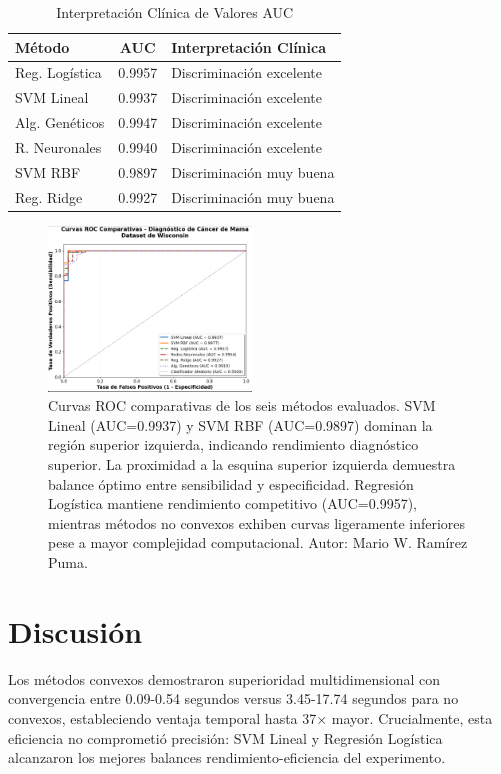 \documentclass[conference]{IEEEtran}
\begin{document}
\begin{table}[htbp]
\caption{Interpretación Clínica de Valores AUC}
\begin{center}
\footnotesize
\begin{tabular}{|l|c|l|}
\hline
\textbf{Método} & \textbf{AUC} & \textbf{Interpretación Clínica} \\
\hline
Reg. Logística & 0.9957 & Discriminación excelente \\
\hline
SVM Lineal & 0.9937 & Discriminación excelente \\
\hline
Alg. Genéticos & 0.9947 & Discriminación excelente \\
\hline
R. Neuronales & 0.9940 & Discriminación excelente \\
\hline
SVM RBF & 0.9897 & Discriminación muy buena \\
\hline
Reg. Ridge & 0.9927 & Discriminación muy buena \\
\hline
\end{tabular}
\label{tab9}
\end{center}
\end{table}

\begin{figure}[htbp]
\centering
\includegraphics[width=0.48\textwidth]{ROC_curvas.png}
\caption{Curvas ROC comparativas de los seis métodos evaluados. SVM Lineal (AUC=0.9937) y SVM RBF (AUC=0.9897) dominan la región superior izquierda, indicando rendimiento diagnóstico superior. La proximidad a la esquina superior izquierda demuestra balance óptimo entre sensibilidad y especificidad. Regresión Logística mantiene rendimiento competitivo (AUC=0.9957), mientras métodos no convexos exhiben curvas ligeramente inferiores pese a mayor complejidad computacional. Autor: Mario W. Ramírez Puma.}
\label{fig:roc_curves}
\end{figure}
\section{Discusión}
Los métodos convexos demostraron superioridad multidimensional con convergencia entre 0.09-0.54 segundos versus 3.45-17.74 segundos para no convexos, estableciendo ventaja temporal hasta 37$\times$ mayor. Crucialmente, esta eficiencia no comprometió precisión: SVM Lineal y Regresión Logística alcanzaron los mejores balances rendimiento-eficiencia del experimento.
\end{document}
